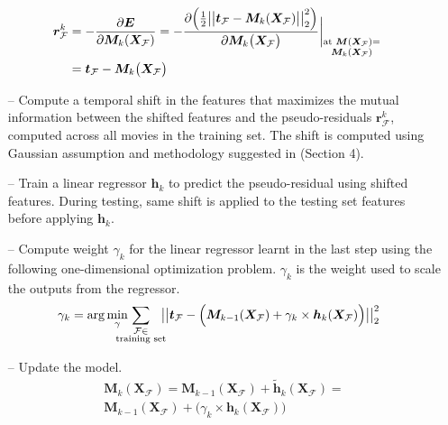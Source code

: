 \documentclass{article}
\begin{document}
\begin{spacing}{0.9}
\begin{itemize}
\begin{equation} \label{pseudores}
\vspace{-1mm}
\begin{aligned}
\hspace{-4mm}\bm r^k_\mathcal F &= -\frac {\partial \bm E} {\partial \bm M_k(\bm X_\mathcal F)} 
= - { \frac {\partial \Big({\frac{1}{2}\big|\big| \bm t_\mathcal F - {\bm M}_k (\bm X_\mathcal F)\big|\big|^2_2}\Big)} {\partial {\bm M}_k\big({\bm X}_\mathcal F\big)} \bigg|}_{\substack{{\text{at }{\bm M}({\bm X}_\mathcal F) =} \\ {{\bm M}_k({\bm X}_\mathcal F)}}}\\
&= \bm t_\mathcal F - \bm M_k\big( \bm X_\mathcal F \big)
\end{aligned}
\end{equation}

\item[--] Compute a temporal shift in the features that maximizes the mutual information between the shifted features and the pseudo-residuals $\bm r^k_\mathcal F$, computed across all movies in the training set.
The shift is computed using Gaussian assumption and methodology suggested in \cite{mariooryad2015correcting} (Section 4).

\item[--] Train a linear regressor $\bm h_k$ to predict the pseudo-residual using shifted features. During testing, same shift is applied to the testing set features before applying $\bm h_k$.

\item[--] Compute weight $\gamma_k$ for the linear regressor learnt in the last step using the following one-dimensional optimization problem. $\gamma_k$ is the weight used to scale the outputs from the regressor. 
\begin{equation}
\hspace{-3mm}\gamma_k = \arg\min_{\gamma} \hspace{-4mm} \sum_{\substack{{\mathcal F \in} \\ {\text{training set}}}}\hspace{-2mm} \big|\big| \bm t_\mathcal F - \Big( \bm M_{k-1} (\bm X_\mathcal F) + \gamma_k \times \bm h_k(\bm X_\mathcal F)\Big) \big|\big|^2_2
\end{equation} 
\vspace{-4mm}

\item[--] Update the model. 
\begin{equation}
\begin{aligned}
\bm M_k(\bm X_\mathcal F) = \bm M_{k-1} (\bm X_\mathcal F) + \tilde{\bm h}_k(\bm X_\mathcal F) = \\
\bm M_{k-1} (\bm X_\mathcal F) + \big(\gamma_k \times \bm h_k(\bm X_\mathcal F)\big)
\end{aligned}
\end{equation}


\end{itemize}
\end{spacing}
\end{document}
